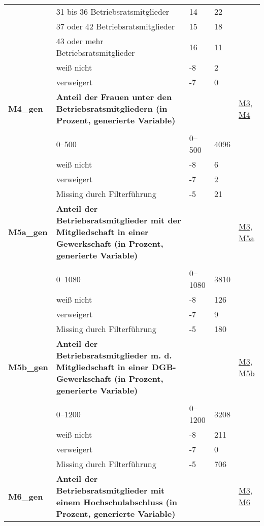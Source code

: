 \begin{longtable}{| L{2.5cm} | L{8.25cm}| C{1.5cm} | R{1.25cm} | C{2.25cm} |  }
   & 31 bis 36 Betriebsratsmitglieder & 14 & 22 &  \\ 
   & 37 oder 42 Betriebsratsmitglieder & 15 & 18 &  \\ 
   & 43 oder mehr Betriebsratsmitglieder & 16 & 11 &  \\ 
   & weiß nicht & -8 & 2 &  \\ 
   & verweigert & -7 & 0 &  \\ 
   \midrule
\textbf{M4\_gen}\label{var:suf:M4:gen} & \textbf{Anteil der Frauen unter den Betriebsratsmitgliedern (in Prozent, generierte Variable)} &  &  & \hyperref[M3]{M3}, \hyperref[M4]{M4} \\ 
   &  &  &  &  \\ 
   & 0--500 & 0--500 & 4096 &  \\ 
   & weiß nicht & -8 & 6 &  \\ 
   & verweigert & -7 & 2 &  \\ 
   & Missing durch Filterführung & -5 & 21 &  \\ 
   \midrule
\textbf{M5a\_gen}\label{var:suf:M5a:gen} & \textbf{Anteil der Betriebsratsmitglieder mit der Mitgliedschaft in einer Gewerkschaft (in Prozent, generierte Variable)} &  &  & \hyperref[M3]{M3}, \hyperref[M5a]{M5a} \\ 
   &  &  &  &  \\ 
   & 0--1080 & 0--1080 & 3810 &  \\ 
   & weiß nicht & -8 & 126 &  \\ 
   & verweigert & -7 & 9 &  \\ 
   & Missing durch Filterführung & -5 & 180 &  \\ 
   \midrule
\textbf{M5b\_gen}\label{var:suf:M5b:gen} & \textbf{Anteil der Betriebsratsmitglieder m. d. Mitgliedschaft in einer DGB-Gewerkschaft (in Prozent, generierte Variable)} &  &  & \hyperref[M3]{M3}, \hyperref[M5b]{M5b} \\ 
   &  &  &  &  \\ 
   & 0--1200 & 0--1200 & 3208 &  \\ 
   & weiß nicht & -8 & 211 &  \\ 
   & verweigert & -7 & 0 &  \\ 
   & Missing durch Filterführung & -5 & 706 &  \\ 
   \midrule
\textbf{M6\_gen}\label{var:suf:M6:gen} & \textbf{Anteil der Betriebsratsmitglieder mit einem Hochschulabschluss (in Prozent, generierte Variable)} &  &  & \hyperref[M3]{M3}, \hyperref[M6]{M6} \\ 

\end{longtable}
